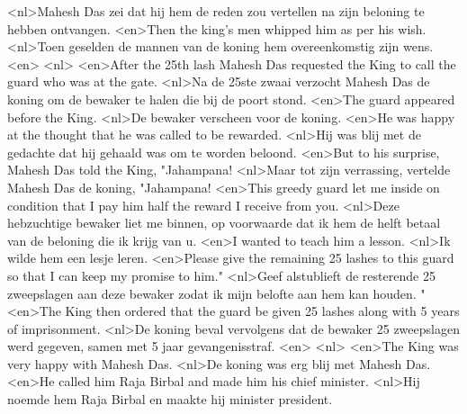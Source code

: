 <nl>Mahesh Das zei dat hij hem de reden zou vertellen na  zijn beloning te hebben ontvangen.
<en>Then the king’s men whipped him as per his wish.
<nl>Toen geselden de mannen van de koning hem overeenkomstig zijn wens.
<en>
<nl>
<en>After the 25th lash Mahesh Das requested the King to call the guard who was at the gate.
<nl>Na de 25ste zwaai verzocht Mahesh Das de koning om de bewaker te halen die bij de poort stond.
<en>The guard appeared before the King.
<nl>De bewaker verscheen voor de koning.
<en>He was happy at the thought that he was called to be rewarded.
<nl>Hij was blij met de gedachte dat hij gehaald was om te worden beloond.
<en>But to his surprise, Mahesh Das told the King, "Jahampana!
<nl>Maar tot zijn verrassing, vertelde Mahesh Das de koning, "Jahampana!
<en>This greedy guard let me inside on condition that I pay him half the reward I receive from you.
<nl>Deze hebzuchtige bewaker liet me binnen, op voorwaarde dat ik hem de helft betaal van de beloning die ik  krijg  van u.
<en>I wanted to teach him a lesson.
<nl>Ik wilde hem een lesje leren.
<en>Please give the remaining 25 lashes to this guard so that I can keep my promise to him."
<nl>Geef alstublieft de resterende 25 zweepslagen aan deze bewaker zodat ik mijn belofte aan hem kan houden. "
<en>The King then ordered that the guard be given 25 lashes along with 5 years of imprisonment.
<nl>De koning beval vervolgens dat de bewaker 25 zweepslagen werd gegeven, samen met 5 jaar gevangenisstraf.
<en>
<nl>
<en>The King was very happy with Mahesh Das.
<nl>De koning was erg blij met Mahesh Das.
<en>He called him Raja Birbal and made him his chief minister.
<nl>Hij noemde  hem Raja Birbal en maakte hij minister president.
